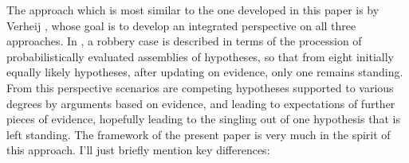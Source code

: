 \documentclass[10pt,leqno]{article}
\begin{document}
The approach which is most similar to the one developed in this paper is by Verheij \citep{verheij2014catch,verheij2015arguments,verheijproof2017}, whose goal is to develop an integrated perspective on all three approaches. In \citep{verheij2014catch}, a robbery case is described in terms of the procession of probabilistically evaluated assemblies of hypotheses, so that from eight initially equally likely hypotheses, after updating on evidence, only one remains standing. From this perspective scenarios are competing hypotheses supported to various degrees by arguments based on evidence, and leading to expectations of further pieces of evidence, hopefully leading to the singling out of one hypothesis that is left standing.  The framework of the present paper is very much in the spirit of this approach. I'll just briefly mention key differences:
\end{document}
